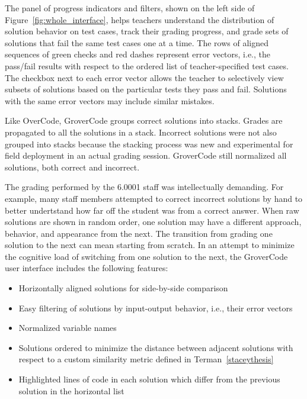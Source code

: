 

The panel of progress indicators and filters, shown on the left side of Figure~\ref{fig:whole_interface}, helps teachers understand the distribution of solution behavior on test cases, track their grading progress, and grade sets of solutions that fail the same test cases one at a time. The rows of aligned sequences of green checks and red dashes represent error vectors, i.e., the pass/fail results with respect to the ordered list of teacher-specified test cases. The checkbox next to each error vector allows the teacher to selectively view subsets of solutions based on the particular tests they pass and fail. Solutions with the same error vectors may include similar mistakes. 

Like OverCode, GroverCode groups correct solutions into stacks. Grades are propagated to all the solutions in a stack. Incorrect solutions were not also grouped into stacks because the stacking process was new and experimental for field deployment in an actual grading session. GroverCode still normalized all solutions, both correct and incorrect.

The grading performed by the 6.0001 staff was intellectually demanding. For example, many staff members attempted to correct incorrect solutions by hand to better undertstand how far off the student was from a correct answer. When raw solutions are shown in random order, one solution may have a different approach, behavior, and appearance from the next. The transition from grading one solution to the next can mean starting from scratch. In an attempt to minimize the cognitive load of switching from one solution to the next, the GroverCode user interface includes the following features:
\begin{itemize}
\item Horizontally aligned solutions for side-by-side comparison
\item Easy filtering of solutions by input-output behavior, i.e., their error vectors
\item Normalized variable names
\item Solutions ordered to minimize the distance between adjacent solutions with respect to a custom similarity metric defined in Terman~\ref{staceythesis}
\item Highlighted lines of code in each solution which differ from the previous solution in the horizontal list
\end{itemize}

